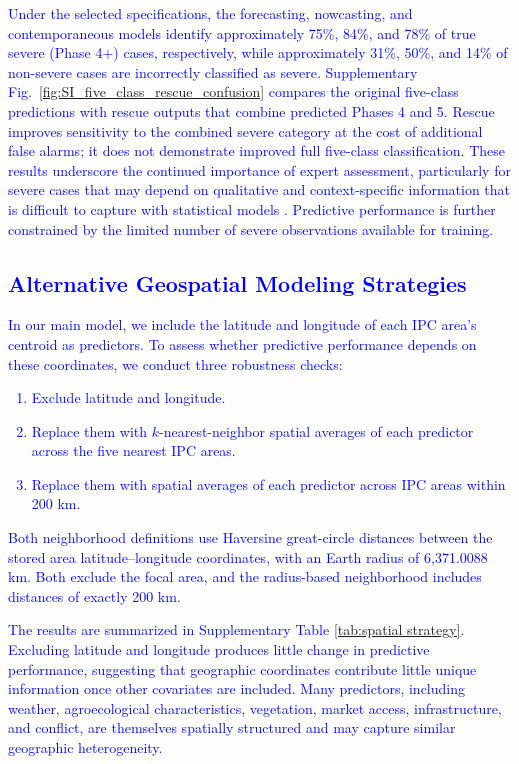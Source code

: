 \documentclass[pdflatex,sn-mathphys-num]{sn-jnl}%
\theoremstyle{thmstyleone}%
\theoremstyle{thmstyletwo}%
\theoremstyle{thmstylethree}%
\begin{document}
\textcolor{blue}{Under the selected specifications, the forecasting, nowcasting, and contemporaneous models identify approximately 75\%, 84\%, and 78\% of true severe (Phase 4+) cases, respectively, while approximately 31\%, 50\%, and 14\% of non-severe cases are incorrectly classified as severe. Supplementary Fig.~\ref{fig:SI_five_class_rescue_confusion} compares the original five-class predictions with rescue outputs that combine predicted Phases 4 and 5. Rescue improves sensitivity to the combined severe category at the cost of additional false alarms; it does not demonstrate improved full five-class classification. These results underscore the continued importance of expert assessment, particularly for severe cases that may depend on qualitative and context-specific information that is difficult to capture with statistical models \cite{Anderson2026ResponsibleAI}. Predictive performance is further constrained by the limited number of severe observations available for training.}

\subsection*{\textcolor{blue}{Alternative Geospatial Modeling Strategies}}

\textcolor{blue}{In our main model, we include the latitude and longitude of each IPC area's centroid as predictors. To assess whether predictive performance depends on these coordinates, we conduct three robustness checks:}
\textcolor{blue}{\begin{enumerate}
    \item Exclude latitude and longitude.
    \item Replace them with $k$-nearest-neighbor spatial averages of each predictor across the five nearest IPC areas.
    \item Replace them with spatial averages of each predictor across IPC areas within 200 km.
\end{enumerate}}

\textcolor{blue}{Both neighborhood definitions use Haversine great-circle distances between the stored area latitude--longitude coordinates, with an Earth radius of 6,371.0088 km. Both exclude the focal area, and the radius-based neighborhood includes distances of exactly 200 km.}

\textcolor{blue}{The results are summarized in Supplementary Table \ref{tab:spatial strategy}. Excluding latitude and longitude produces little change in predictive performance, suggesting that geographic coordinates contribute little unique information once other covariates are included. Many predictors, including weather, agroecological characteristics, vegetation, market access, infrastructure, and conflict, are themselves spatially structured and may capture similar geographic heterogeneity.}
\end{document}
